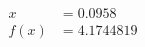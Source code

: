 \documentclass[preview]{standalone}
\begin{document}
\begin{align*}
x &= 0.0958\\f(x) &= 4.1744819
\end{align*}
\end{document}
